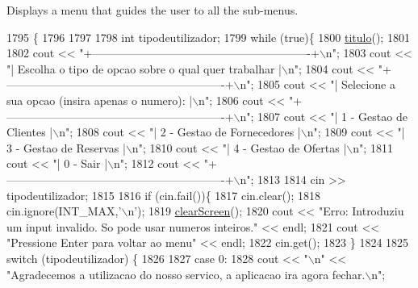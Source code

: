 Displays a menu that guides the user to all the sub-\/menus. 


\begin{DoxyCode}
1795 \{
1796     
1797     
1798     \textcolor{keywordtype}{int} tipodeutilizador;
1799     \textcolor{keywordflow}{while} (\textcolor{keyword}{true})\{
1800         \hyperlink{classEmpresa_ad79f7196a8ce7256771cbd7b9542155c}{titulo}();
1801         
1802         cout << \textcolor{stringliteral}{"+----------------------------------------------------------+\(\backslash\)n"};
1803         cout << \textcolor{stringliteral}{"| Escolha o tipo de opcao sobre o qual quer trabalhar      |\(\backslash\)n"};
1804         cout << \textcolor{stringliteral}{"+----------------------------------------------------------+\(\backslash\)n"};
1805         cout << \textcolor{stringliteral}{"| Selecione a sua opcao (insira apenas o numero):          |\(\backslash\)n"};
1806         cout << \textcolor{stringliteral}{"+----------------------------------------------------------+\(\backslash\)n"};
1807         cout << \textcolor{stringliteral}{"| 1 - Gestao de Clientes                                   |\(\backslash\)n"};
1808         cout << \textcolor{stringliteral}{"| 2 - Gestao de Fornecedores                               |\(\backslash\)n"};
1809         cout << \textcolor{stringliteral}{"| 3 - Gestao de Reservas                                   |\(\backslash\)n"};
1810         cout << \textcolor{stringliteral}{"| 4 - Gestao de Ofertas                                    |\(\backslash\)n"};
1811         cout << \textcolor{stringliteral}{"| 0 - Sair                                                 |\(\backslash\)n"};
1812         cout << \textcolor{stringliteral}{"+----------------------------------------------------------+\(\backslash\)n"};
1813 
1814         cin >> tipodeutilizador;
1815 
1816         \textcolor{keywordflow}{if} (cin.fail())\{
1817             cin.clear();
1818             cin.ignore(INT\_MAX,\textcolor{charliteral}{'\(\backslash\)n'});
1819             \hyperlink{menu_8h_aceb70c1ed7e11f0863a868704f02214b}{clearScreen}();
1820             cout << \textcolor{stringliteral}{"Erro: Introduziu um input invalido. So pode usar numeros inteiros."} << endl;
1821             cout << \textcolor{stringliteral}{"Pressione Enter para voltar ao menu"} << endl;
1822             cin.get();
1823         \}
1824 
1825         \textcolor{keywordflow}{switch} (tipodeutilizador) \{
1826 
1827         \textcolor{keywordflow}{case} 0:
1828             cout << \textcolor{stringliteral}{"\(\backslash\)n"} << \textcolor{stringliteral}{"Agradecemos a utilizacao do nosso servico, a aplicacao ira agora fechar.\(\backslash\)n"};

\end{DoxyCode}
